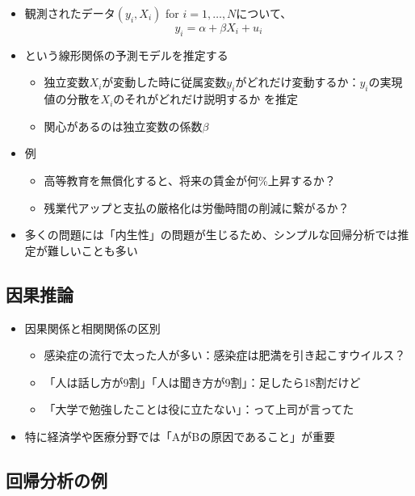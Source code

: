 \documentclass[
]{ltjsarticle}
\providecommand{\tightlist}{%
  \setlength{\itemsep}{0pt}\setlength{\parskip}{0pt}}
\begin{document}
\begin{itemize}
\tightlist
\item
  観測されたデータ\((y_i, X_i)\) for \(i = 1, \ldots, N\)について、
  \[y_i = \alpha + \beta X_i + u_i\]
\item
  という線形関係の予測モデルを推定する

  \begin{itemize}
  \tightlist
  \item
    独立変数\(X_i\)が変動した時に従属変数\(y_i\)がどれだけ変動するか：\(y_i\)の実現値の分散を\(X_i\)のそれがどれだけ説明するか
    を推定
  \item
    関心があるのは独立変数の係数\(\beta\)
  \end{itemize}
\item
  例

  \begin{itemize}
  \tightlist
  \item
    高等教育を無償化すると、将来の賃金が何\%上昇するか？
  \item
    残業代アップと支払の厳格化は労働時間の削減に繋がるか？
  \end{itemize}
\item
  多くの問題には「内生性」の問題が生じるため、シンプルな回帰分析では推定が難しいことも多い
\end{itemize}

\hypertarget{ux56e0ux679cux63a8ux8ad6}{%
\subsection{因果推論}\label{ux56e0ux679cux63a8ux8ad6}}

\begin{itemize}
\tightlist
\item
  因果関係と相関関係の区別

  \begin{itemize}
  \tightlist
  \item
    感染症の流行で太った人が多い：感染症は肥満を引き起こすウイルス？
  \item
    「人は話し方が9割」「人は聞き方が9割」：足したら18割だけど
  \item
    「大学で勉強したことは役に立たない」：って上司が言ってた
  \end{itemize}
\item
  特に経済学や医療分野では「AがBの原因であること」が重要
\end{itemize}

\hypertarget{ux56deux5e30ux5206ux6790ux306eux4f8b}{%
\subsection{回帰分析の例}\label{ux56deux5e30ux5206ux6790ux306eux4f8b}}
\end{document}
